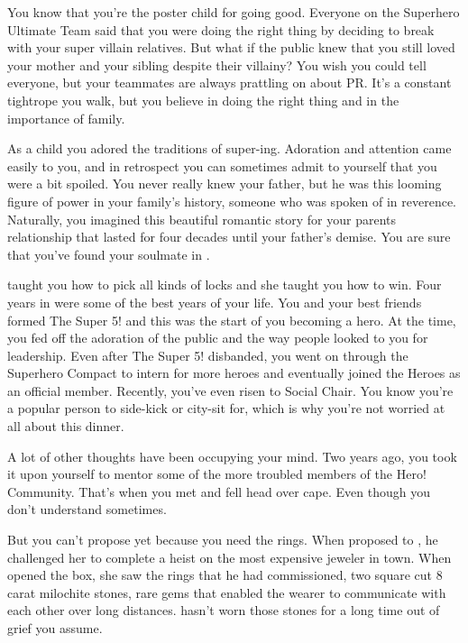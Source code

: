 \documentclass[char]{LRSguildcamp1}
\begin{document}
\name{\cYoungest{}}

You know that you’re the poster child for going good.  Everyone on the Superhero Ultimate Team said that you were doing the right thing by deciding to break with your super villain relatives. But what if the public knew that you still loved your mother and your sibling despite their villainy? You wish you could tell everyone, but your teammates are always prattling on about PR.  It's a constant tightrope you walk, but you believe in doing the right thing and in the importance of family. 

As a child you adored the traditions of super-ing. Adoration and attention came easily to you, and in retrospect you can sometimes admit to yourself that you were a bit spoiled. You never really knew your father, but he was this looming figure of power in your family's history, someone who was spoken of in reverence. Naturally, you imagined this beautiful romantic story for your parents relationship that lasted for four decades until your father's demise. You are sure that you've found your soulmate in \cYS. 

\cGrandma taught you how to pick all kinds of locks and she taught you how to win. Four years in \pSuperSchool were some of the best years  of your life. You and your best friends formed The Super 5! and this was the start of you becoming a hero. At the time, you fed off the adoration of the public and the way people looked to you for leadership. Even after The Super 5! disbanded, you went on through the Superhero Compact to intern for more heroes and eventually joined the Heroes as an official member. Recently, you've even risen to Social Chair.  You know you're a popular person to side-kick or city-sit for, which is why you're not worried at all about this dinner. 

A lot of other thoughts have been occupying your mind. Two years ago, you took it upon yourself to mentor some of the more troubled members of the Hero! Community. That's when you met \cYS and fell head over cape.  Even though you don't understand \cYS sometimes.  

But you can't propose yet because you need the rings. When \cGS proposed to \cGrandma, he challenged her to complete a heist on the most expensive jeweler in town. When \cGrandma opened the box, she saw the rings that he had commissioned, two square cut 8 carat milochite stones, rare gems that enabled the wearer to communicate with each other over long distances.  \cGrandma hasn't worn those stones for a long time out of grief you assume. 
\end{document}

